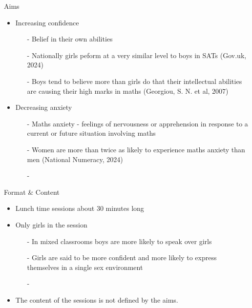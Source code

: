 \documentclass{beamer}  %
\begin{document}
\begin{frame}{Aims}
    \begin{itemize}
        \item Increasing confidence
        \begin{itemize}
            \item[-] Belief in their own abilities
            \item[-]Nationally girls peform at a very similar level to boys in SATs (Gov.uk, 2024)
            \item[-] Boys tend to believe more than girls do that their intellectual abilities are causing their high marks in maths (Georgiou, S. N. et al, 2007)
        \end{itemize}
        \item Decreasing anxiety
        \begin{itemize}
            \item[-] Maths anxiety - feelings of nervousness or apprehension in response to a current or future  situation involving maths 
            \item[-]Women are more than twice as likely to experience maths anxiety than men (National Numeracy, 2024) 
            \item[-] 
        \end{itemize}
    \end{itemize}
\end{frame}

\begin{frame}{Format \& Content}
    \begin{itemize}
        \item Lunch time sessions about 30 minutes long
        \item Only girls in the session
        \begin{itemize}
            \item[-] In mixed classrooms boys are more likely to speak over girls
            \item[-] Girls are said to be more confident and more likely to express themselves in a single sex environment
            \item[-] 
        \end{itemize}
        \item The content of the sessions is not defined by the aims.
    \end{itemize}
\end{frame}
\end{document}
